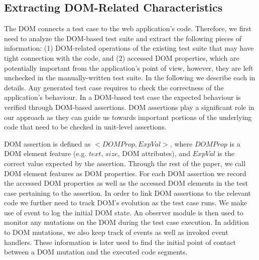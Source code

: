 \subsection{Extracting DOM-Related Characteristics} \label{Sec:extractDomRelatedInfo}
The DOM connects a test case to the web application's \javascript code. Therefore, we first need to analyze the DOM-based test suite and extract the following pieces of information: (1) DOM-related operations of the existing test suite that may have tight connection with the \javascript code, and (2) accessed DOM properties, which are potentially important from the application's point of view, however, they are left unchecked in the manually-written test suite. In the following we describe each in details.
Any generated test case requires to check the correctness of the application's behaviour. In a DOM-based test case the expected behaviour is verified through DOM-based assertions. 
DOM assertions play a significant role in our approach as they can guide us towards important portions of the underlying \javascript code that need to be checked in unit-level assertions.

DOM assertion is defined as $<DOMProp,ExpVal>$, where $DOMProp$ is a DOM element feature (e.g. $text$, $size$, DOM attributes), and $ExpVal$ is the correct value expected by the assertion. Through the rest of the paper, we call DOM element features as DOM properties.
For each DOM assertion we record the accessed DOM properties as well as the accessed DOM elements in the test case pertaining to the assertion. In order to link DOM assertions to the relevant \javascript code we further need to track DOM's evolution as the test case runs. We make use of  event to log the initial DOM state. An observer module is then used to monitor any mutations on the DOM during the test case execution. In addition to DOM mutations, we also keep track of \javascript events as well as invoked event handlers. These information is later used to find the initial point of contact between a DOM mutation and the executed code segments. 
